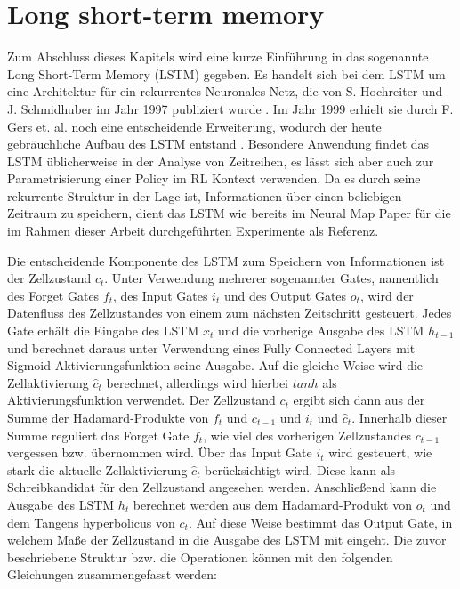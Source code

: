 \section{Long short-term memory}
\label{sec_lstm}

Zum Abschluss dieses Kapitels wird eine kurze Einführung in das sogenannte Long Short-Term Memory (LSTM) gegeben. Es handelt sich bei dem LSTM um eine Architektur für ein rekurrentes Neuronales Netz, die von S. Hochreiter und J. Schmidhuber im Jahr 1997 publiziert wurde \cite{LSTM}. Im Jahr 1999 erhielt sie durch F. Gers et. al. noch eine entscheidende Erweiterung, wodurch der heute gebräuchliche Aufbau des LSTM entstand \cite{ForgetGate}. Besondere Anwendung findet das LSTM üblicherweise in der Analyse von Zeitreihen, es lässt sich aber auch zur Parametrisierung einer Policy im RL Kontext verwenden. Da es durch seine rekurrente Struktur in der Lage ist, Informationen über einen beliebigen Zeitraum zu speichern, dient das LSTM wie bereits im Neural Map Paper für die im Rahmen dieser Arbeit durchgeführten Experimente als Referenz.

Die entscheidende Komponente des LSTM zum Speichern von Informationen ist der Zellzustand $c_t$. Unter Verwendung mehrerer sogenannter Gates, namentlich des Forget Gates $f_t$, des Input Gates $i_t$ und des Output Gates $o_t$, wird der Datenfluss des Zellzustandes von einem zum nächsten Zeitschritt gesteuert. Jedes Gate erhält die Eingabe des LSTM $x_t$ und die vorherige Ausgabe des LSTM $h_{t-1}$ und berechnet daraus unter Verwendung eines Fully Connected Layers mit Sigmoid-Aktivierungsfunktion seine Ausgabe. Auf die gleiche Weise wird die Zellaktivierung $\hat{c}_t$ berechnet, allerdings wird hierbei $tanh$ als Aktivierungsfunktion verwendet. Der Zellzustand $c_t$ ergibt sich dann aus der Summe der Hadamard-Produkte von $f_t$ und $c_{t-1}$ und  $i_t$ und $\hat{c}_t$. Innerhalb dieser Summe reguliert das Forget Gate $f_t$, wie viel des vorherigen Zellzustandes $c_{t-1}$ vergessen bzw. übernommen wird. Über das Input Gate $i_t$ wird gesteuert, wie stark die aktuelle Zellaktivierung $\hat{c}_t$ berücksichtigt wird. Diese kann als Schreibkandidat für den Zellzustand angesehen werden. Anschließend kann die Ausgabe des LSTM $h_t$ berechnet werden aus dem Hadamard-Produkt von $o_t$ und dem Tangens hyperbolicus von $c_t$. Auf diese Weise bestimmt das Output Gate, in welchem Maße der Zellzustand in die Ausgabe des LSTM mit eingeht. Die zuvor beschriebene Struktur bzw. die Operationen können mit den folgenden Gleichungen zusammengefasst werden:

